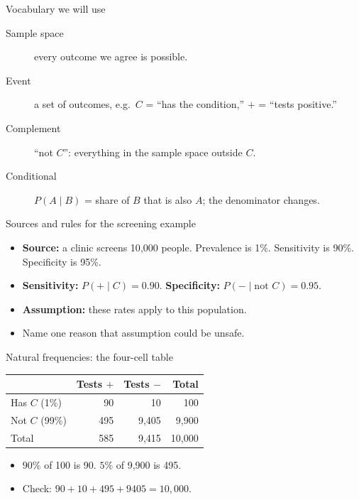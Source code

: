 \documentclass[aspectratio=169,10pt]{beamer}
\begin{document}
\begin{frame}{Vocabulary we will use}
\begin{description}
\item[Sample space] every outcome we agree is possible.
\item[Event] a set of outcomes, e.g.\ $C$ = ``has the condition,'' $+$ = ``tests positive.''
\item[Complement] ``not $C$'': everything in the sample space outside $C$.
\item[Conditional] $P(A\mid B)$ = share of $B$ that is also $A$; the denominator changes.
\end{description}
\end{frame}

\begin{frame}{Sources and rules for the screening example}
\begin{itemize}
\item \textbf{Source:} a clinic screens 10{,}000 people. Prevalence is 1\%. Sensitivity is 90\%. Specificity is 95\%.
\item \textbf{Sensitivity:} $P(+\mid C)=0.90$. \textbf{Specificity:} $P(-\mid \text{not }C)=0.95$.
\item \textbf{Assumption:} these rates apply to this population.
\item Name one reason that assumption could be unsafe.
\end{itemize}
\end{frame}

\begin{frame}{Natural frequencies: the four-cell table}
\centering
\begin{tabular}{l|r|r|r}
 & Tests $+$ & Tests $-$ & Total \\ \hline
Has $C$ (1\%) & 90 & 10 & 100 \\
Not $C$ (99\%) & 495 & 9{,}405 & 9{,}900 \\ \hline
Total & 585 & 9{,}415 & 10{,}000
\end{tabular}
\vspace{3mm}
\begin{itemize}
\item $90\%$ of 100 is 90. $5\%$ of 9{,}900 is 495.
\item Check: $90+10+495+9405=10{,}000$.
\end{itemize}
\end{frame}
\end{document}
